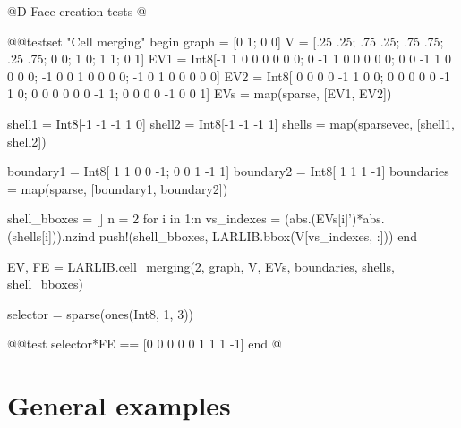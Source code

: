 @D Face creation tests
@{@@testset "Cell merging" begin
    graph = [0 1; 0 0]
    V = [.25 .25; .75 .25; .75 .75; .25 .75;
           0   0;   1   0;   1   1;   0   1]
    EV1 = Int8[-1  1  0  0  0  0  0  0;
                0 -1  1  0  0  0  0  0;
                0  0 -1  1  0  0  0  0;
               -1  0  0  1  0  0  0  0;
               -1  0  1  0  0  0  0  0]
    EV2 = Int8[ 0  0  0  0 -1  1  0  0;
                0  0  0  0  0 -1  1  0;
                0  0  0  0  0  0 -1  1;
                0  0  0  0 -1  0  0  1]
    EVs = map(sparse, [EV1, EV2])

    shell1 = Int8[-1 -1 -1  1  0]
    shell2 = Int8[-1 -1 -1  1]
    shells = map(sparsevec, [shell1, shell2])

    boundary1 = Int8[ 1  1  0  0 -1;
                      0  0  1 -1  1]
    boundary2 = Int8[ 1  1  1 -1]
    boundaries = map(sparse, [boundary1, boundary2])

    shell_bboxes = []
    n = 2
    for i in 1:n
        vs_indexes = (abs.(EVs[i]')*abs.(shells[i])).nzind
        push!(shell_bboxes, LARLIB.bbox(V[vs_indexes, :]))
    end

    EV, FE = LARLIB.cell_merging(2, graph, V, EVs, boundaries, shells, shell_bboxes)

    selector = sparse(ones(Int8, 1, 3))

    @@test selector*FE == [0  0  0  0  0  1  1  1 -1]
end
@}


\section{General examples}
\label{sec:planar_arrangement_examples}

